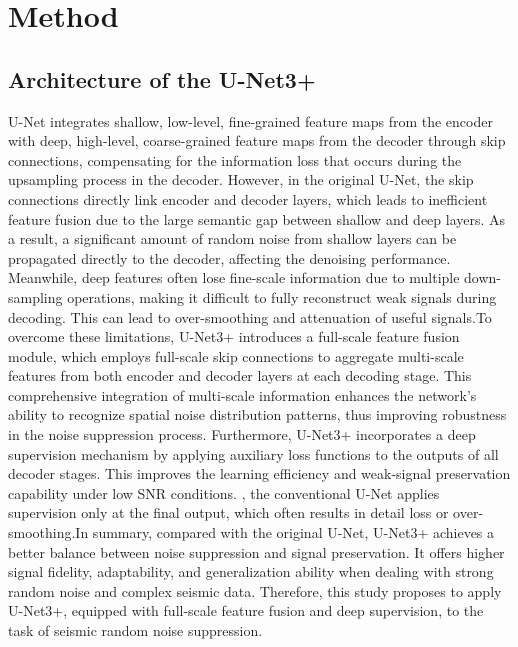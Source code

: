 \documentclass[preprint,12pt,authoryear]{elsarticle}
\begin{document}
\section{Method}
\label{sec2}
\subsection{Architecture of the U-Net3+}
\label{subsec1}

U-Net integrates shallow, low-level, fine-grained feature maps from the encoder with deep, high-level, coarse-grained feature maps from the decoder through skip connections, compensating for the information loss that occurs during the upsampling process in the decoder. However, in the original U-Net, the skip connections directly link encoder and decoder layers, which leads to inefficient feature fusion due to the large semantic gap between shallow and deep layers. As a result, a significant amount of random noise from shallow layers can be propagated directly to the decoder, affecting the denoising performance. Meanwhile, deep features often lose fine-scale information due to multiple down-sampling operations, making it difficult to fully reconstruct weak signals during decoding. This can lead to over-smoothing and attenuation of useful signals.To overcome these limitations, U-Net3+ introduces a full-scale feature fusion module, which employs full-scale skip connections to aggregate multi-scale features from both encoder and decoder layers at each decoding stage. This comprehensive integration of multi-scale information enhances the network's ability to recognize spatial noise distribution patterns, thus improving robustness in the noise suppression process. Furthermore, U-Net3+ incorporates a deep supervision mechanism by applying auxiliary loss functions to the outputs of all decoder stages. This improves the learning efficiency and weak-signal preservation capability under low SNR conditions. , the conventional U-Net applies supervision only at the final output, which often results in detail loss or over-smoothing.In summary, compared with the original U-Net, U-Net3+ achieves a better balance between noise suppression and signal preservation. It offers higher signal fidelity, adaptability, and generalization ability when dealing with strong random noise and complex seismic data. Therefore, this study proposes to apply U-Net3+, equipped with full-scale feature fusion and deep supervision, to the task of seismic random noise suppression.
\end{document}

